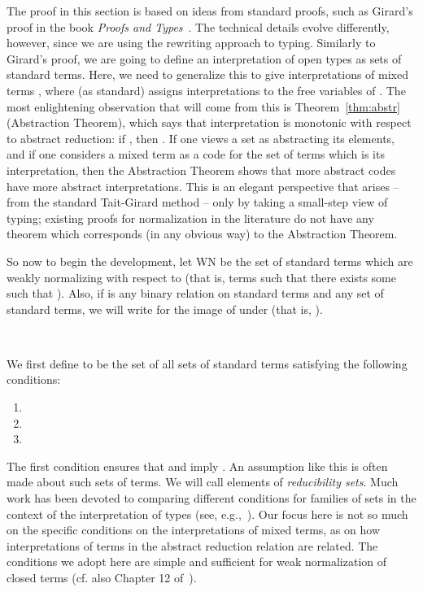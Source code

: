 \documentclass{LMCS}
\begin{document}
The proof in this section is based on ideas from standard proofs, such
as Girard's proof in the book \emph{Proofs and
  Types}~\cite{girard-proofs-types}.  The technical details evolve
differently, however, since we are using the rewriting approach to
typing.  Similarly to Girard's proof, we are going to define an
interpretation of open types as sets of standard terms.  Here, we need
to generalize this to give interpretations  of mixed
terms , where (as standard)  assigns interpretations to the
free variables of .  The most enlightening observation that will
come from this is Theorem~\ref{thm:abstr} (Abstraction Theorem), which
says that interpretation is monotonic with respect to abstract
reduction: if , then
.  If one views a set as
abstracting its elements, and if one considers a mixed term as a code
for the set of terms which is its interpretation, then the Abstraction
Theorem shows that more abstract codes have more abstract
interpretations.  This is an elegant perspective that arises -- from
the standard Tait-Girard method -- only by taking a small-step view of
typing; existing proofs for normalization in the literature do not
have any theorem which corresponds (in any obvious way) to the
Abstraction Theorem.

So now to begin the development, let WN be the set of standard terms
which are weakly normalizing with respect to  (that is, terms
 such that there exists some  such that ).  Also, if  is any binary relation on standard terms
and  any set of standard terms, we will write  for the
image of  under  (that is, ). 

\

\noindent We first define  to be the set of all sets 
of standard terms satisfying the following conditions:
\begin{enumerate}[(1)]
\item 
\item 
\item 
\end{enumerate}
\noindent The first condition ensures that  and 
imply .  An assumption like this is often made about such
sets of terms.  We will call elements of 
\emph{reducibility sets}.  Much work has been devoted to comparing
different conditions for families of sets in the context of the
interpretation of types (see, e.g.,~\cite{riba07,gallier90}).  Our
focus here is not so much on the specific conditions on the
interpretations of mixed terms, as on how interpretations of terms in
the abstract reduction relation are related.  The conditions we adopt
here are simple and sufficient for weak normalization of closed terms
(cf. also Chapter 12 of~\cite{pierce02}).
\end{document}
